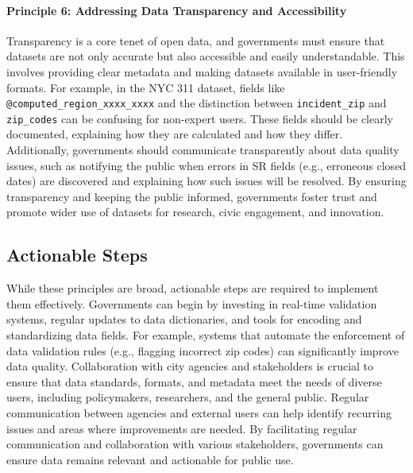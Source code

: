 \documentclass[linenumber]{jdsart}
\begin{document}
\paragraph{Principle 6: Addressing Data Transparency and Accessibility}
Transparency is a core tenet of open data, and governments must ensure 
that datasets are not only accurate but also accessible and easily 
understandable. This involves providing clear metadata and making 
datasets available in user-friendly formats. For example, in the NYC 
311 dataset, fields like \texttt{@computed\_region\_xxxx\_xxxx} and 
the distinction between \texttt{incident\_zip} and \texttt{zip\_codes} 
can be confusing for non-expert users. These fields should be clearly 
documented, explaining how they are calculated and how they differ. 
Additionally, governments should communicate transparently about 
data quality issues, such as notifying the public when errors in SR 
fields (e.g., erroneous closed dates) are discovered and explaining 
how such issues will be resolved. By ensuring transparency and 
keeping the public informed, governments foster trust and promote 
wider use of datasets for research, civic engagement, and innovation.


\subsection{Actionable Steps}
While these principles are broad, actionable steps are required to 
implement them effectively. Governments can begin by investing in 
real-time validation systems, regular updates to data dictionaries, 
and tools for encoding and standardizing data fields. For example, 
systems that automate the enforcement of data validation rules 
(e.g., flagging incorrect zip codes) can significantly improve data 
quality. Collaboration with city agencies and stakeholders is crucial 
to ensure that data standards, formats, and metadata meet the needs 
of diverse users, including policymakers, researchers, and the 
general public. Regular communication between agencies and external 
users can help identify recurring issues and areas where improvements 
are needed. By facilitating regular communication and collaboration 
with various stakeholders, governments can ensure data remains relevant 
and actionable for public use.
\end{document}
